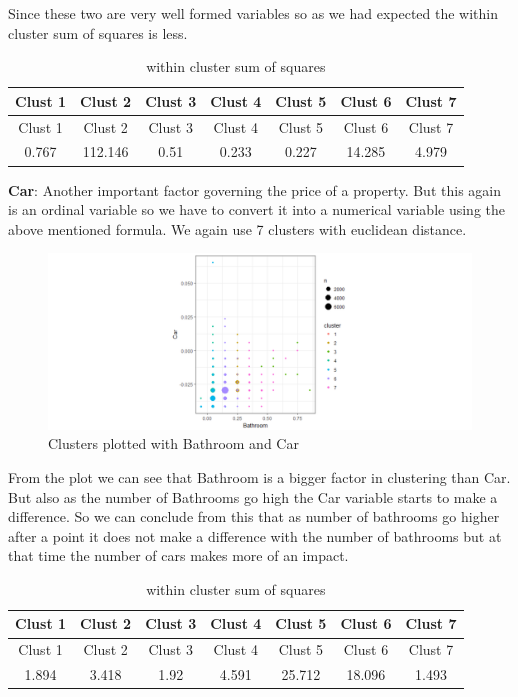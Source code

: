 \documentclass[]{article}
\begin{document}
Since these two are very well formed variables so as we had expected the
within cluster sum of squares is less.

\begin{longtable}[]{@{}ccccccc@{}}
\caption{within cluster sum of squares}\tabularnewline
\toprule
Clust 1 & Clust 2 & Clust 3 & Clust 4 & Clust 5 & Clust 6 & Clust
7\tabularnewline
\midrule
\endfirsthead
\toprule
Clust 1 & Clust 2 & Clust 3 & Clust 4 & Clust 5 & Clust 6 & Clust
7\tabularnewline
\midrule
\endhead
0.767 & 112.146 & 0.51 & 0.233 & 0.227 & 14.285 & 4.979\tabularnewline
\bottomrule
\end{longtable}

\textbf{Car}: Another important factor governing the price of a
property. But this again is an ordinal variable so we have to convert it
into a numerical variable using the above mentioned formula. We again
use 7 clusters with euclidean distance.

\begin{figure}
\centering
\includegraphics{Report_files/figure-latex/unnamed-chunk-10-1.pdf}
\caption{Clusters plotted with Bathroom and Car}
\end{figure}

From the plot we can see that Bathroom is a bigger factor in clustering
than Car. But also as the number of Bathrooms go high the Car variable
starts to make a difference. So we can conclude from this that as number
of bathrooms go higher after a point it does not make a difference with
the number of bathrooms but at that time the number of cars makes more
of an impact.

\begin{longtable}[]{@{}ccccccc@{}}
\caption{within cluster sum of squares}\tabularnewline
\toprule
Clust 1 & Clust 2 & Clust 3 & Clust 4 & Clust 5 & Clust 6 & Clust
7\tabularnewline
\midrule
\endfirsthead
\toprule
Clust 1 & Clust 2 & Clust 3 & Clust 4 & Clust 5 & Clust 6 & Clust
7\tabularnewline
\midrule
\endhead
1.894 & 3.418 & 1.92 & 4.591 & 25.712 & 18.096 & 1.493\tabularnewline
\bottomrule
\end{longtable}
\end{document}
